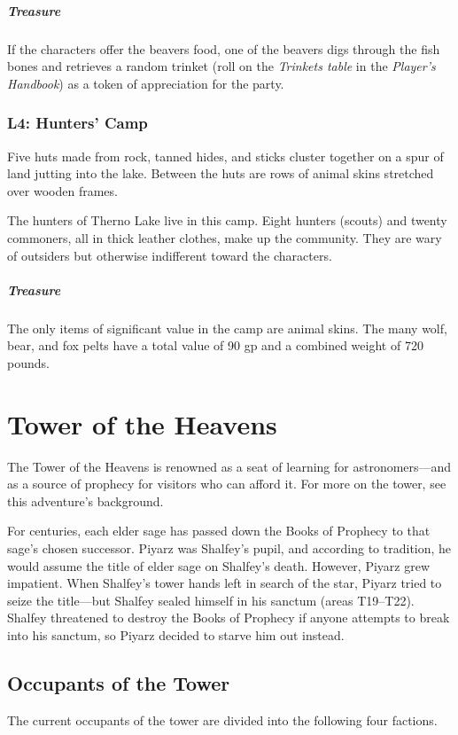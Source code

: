 \documentclass[10pt,a4paper,twoside,bg=print,twocolumn,openany,nodeprecatedcode]{dndbook}
\begin{document}
\subparagraph{Treasure}
If the characters offer the beavers food, one of the beavers digs through the fish bones and retrieves a random trinket (roll on the \textit{Trinkets table} in the \textit{Player's Handbook}) as a token of appreciation for the party.

\subsubsection{L4: Hunters' Camp}
\begin{DndReadAloud}{}
Five huts made from rock, tanned hides, and sticks cluster together on a spur of land jutting into the lake. Between the huts are rows of animal skins stretched over wooden frames.

\end{DndReadAloud}

The hunters of Therno Lake live in this camp. Eight hunters (scouts) and twenty commoners, all in thick leather clothes, make up the community. They are wary of outsiders but otherwise indifferent toward the characters.

\subparagraph{Treasure}
The only items of significant value in the camp are animal skins. The many wolf, bear, and fox pelts have a total value of 90 gp and a combined weight of 720 pounds.

\section{Tower of the Heavens}
The Tower of the Heavens is renowned as a seat of learning for astronomers—and as a source of prophecy for visitors who can afford it. For more on the tower, see this adventure's background.

For centuries, each elder sage has passed down the Books of Prophecy to that sage's chosen successor. Piyarz was Shalfey's pupil, and according to tradition, he would assume the title of elder sage on Shalfey's death. However, Piyarz grew impatient. When Shalfey's tower hands left in search of the star, Piyarz tried to seize the title—but Shalfey sealed himself in his sanctum (areas T19–T22). Shalfey threatened to destroy the Books of Prophecy if anyone attempts to break into his sanctum, so Piyarz decided to starve him out instead.

\subsection{Occupants of the Tower}
The current occupants of the tower are divided into the following four factions.
\end{document}
